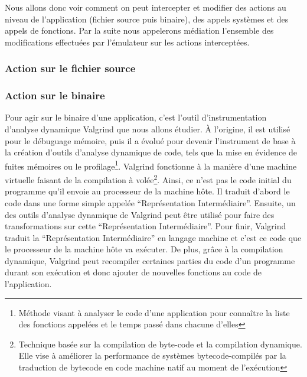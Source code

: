Nous allons donc voir comment on peut intercepter et modifier des actions au
niveau de l'application (fichier source puis binaire), des appels systèmes et
des appels de fonctions. Par la suite nous appelerons médiation l'ensemble des
modifications effectuées par l'émulateur sur les actions interceptées.

\subsubsection{Action sur le fichier source}

\subsubsection{Action sur le binaire}
Pour agir sur le binaire d'une application, c'est l'outil d'instrumentation
d'analyse dynamique Valgrind \citep{Valgrind, Valgrindweb} que nous allons étudier. À l'origine, il est utilisé
pour le débuguage mémoire, puis il a évolué pour devenir l'instrument de base à
la création d'outils d'analyse dynamique de code, tels que la mise en évidence
de fuites mémoires ou le profilage\footnote{Méthode visant à analyser le code
  d'une application pour connaître la liste des fonctions appelées et le temps
  passé dans chacune d'elles}. Valgrind fonctionne à la manière d'une machine
virtuelle faisant de la compilation à volée\footnote{Technique basée sur la
  compilation de byte-code et la compilation dynamique. Elle vise à améliorer la
  performance de systèmes bytecode-compilés par la traduction de bytecode en
  code machine natif au moment de l'exécution}. Ainsi, ce n'est pas le code
initial du programme qu'il envoie au processeur de la machine hôte. Il traduit
d'abord le code dans une forme simple appelée ``Représentation Intermédiaire''. Ensuite, un des outils d'analyse dynamique de Valgrind peut être
utilisé pour faire des transformations sur cette ``Représentation
Intermédiaire''. Pour finir, Valgrind traduit la ``Représentation
Intermédiaire'' en langage machine et c'est ce code que le processeur de la
machine hôte va exécuter. De plus, grâce à la compilation dynamique, Valgrind
peut recompiler certaines parties du code d'un programme durant son exécution et
donc ajouter de nouvelles fonctions au code de l'application.

